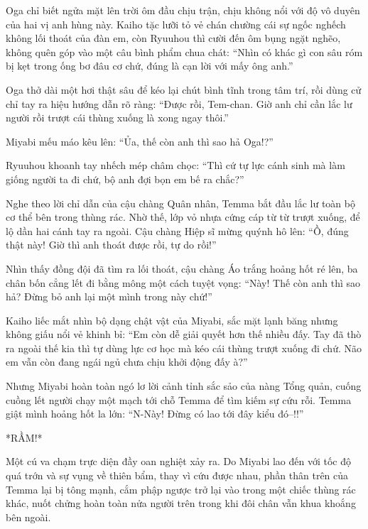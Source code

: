 \documentclass[../main.tex]{subfiles}
\begin{document}

Oga chỉ biết ngửa mặt lên trời ôm đầu chịu trận, chịu không nổi với độ vô duyên của hai vị anh hùng này. Kaiho tặc lưỡi tỏ vẻ chán chường cái sự ngốc nghếch không lối thoát của đàn em, còn Ryuuhou thì cười đến ôm bụng ngặt nghẽo, không quên góp vào một câu bình phẩm chua chát: ``Nhìn có khác gì con sâu róm bị kẹt trong ống bơ đâu cơ chứ, đúng là cạn lời với mấy ông anh.''

Oga thở dài một hơi thật sâu để kéo lại chút bình tĩnh trong tâm trí, rồi dùng cử chỉ tay ra hiệu hướng dẫn rõ ràng: ``Được rồi, Tem-chan. Giờ anh chỉ cần lắc lư người rồi trượt cái thùng xuống là xong ngay thôi.''

Miyabi mếu máo kêu lên: ``Ủa, thế còn anh thì sao hả Oga!?''

Ryuuhou khoanh tay nhếch mép châm chọc: ``Thì cứ tự lực cánh sinh mà làm giống người ta đi chứ, bộ anh đợi bọn em bế ra chắc?''

Nghe theo lời chỉ dẫn của cậu chàng Quân nhân, Temma bắt đầu lắc lư toàn bộ cơ thể bên trong thùng rác. Nhờ thế, lớp vỏ nhựa cứng cáp từ từ trượt xuống, để lộ dần hai cánh tay ra ngoài. Cậu chàng Hiệp sĩ mừng quýnh hô lên: ``Ồ, đúng thật này! Giờ thì anh thoát được rồi, tự do rồi!''

Nhìn thấy đồng đội đã tìm ra lối thoát, cậu chàng Áo trắng hoảng hốt ré lên, ba chân bốn cẳng lết đi bằng mông một cách tuyệt vọng: ``Này! Thế còn anh thì sao hả? Đừng bỏ anh lại một mình trong này chứ!''

Kaiho liếc mắt nhìn bộ dạng chật vật của Miyabi, sắc mặt lạnh băng nhưng không giấu nổi vẻ khinh bỉ: ``Em còn dễ giải quyết hơn thế nhiều đấy. Tay đã thò ra ngoài thế kia thì tự dùng lực cơ học mà kéo cái thùng trượt xuống đi chứ. Não em vẫn còn đang ngái ngủ chưa chịu khởi động đấy à?''

Nhưng Miyabi hoàn toàn ngó lơ lời cảnh tỉnh sắc sảo của nàng Tổng quản, cuống cuồng lết người chạy một mạch tới chỗ Temma để tìm kiếm sự cứu rỗi. Temma giật mình hoảng hốt la lớn: ``N-Này! Đừng có lao tới đây kiểu đó--!!''

*RẦM!*

Một cú va chạm trực diện đầy oan nghiệt xảy ra. Do Miyabi lao đến với tốc độ quá trớn và sự vụng về thiên bẩm, thay vì cứu được nhau, phần thân trên của Temma lại bị tông mạnh, cắm phập ngược trở lại vào trong một chiếc thùng rác khác, nuốt chửng hoàn toàn nửa người trên trong khi đôi chân vẫn khua khoắng bên ngoài.

\end{document}
